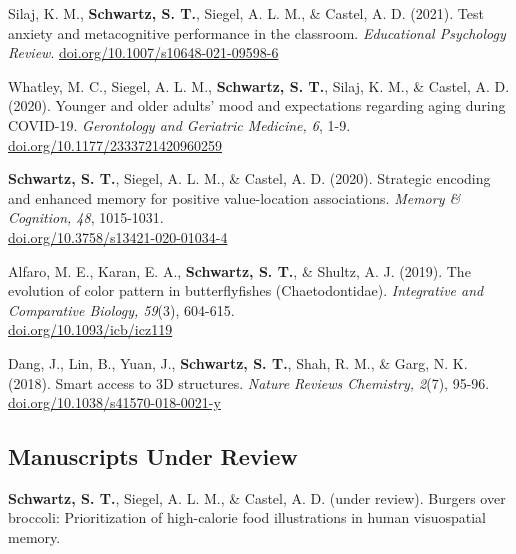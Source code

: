 \pubspace

Silaj, K. M., \textbf{Schwartz, S. T.}, Siegel, A. L. M., \& Castel, A. D. (2021). Test anxiety and metacognitive performance in the classroom. \textit{Educational Psychology Review}. \textcolor{RoyalBlue}{\href{https://doi.org/10.1007/s10648-021-09598-6}{doi.org/10.1007/s10648-021-09598-6}}

\pubspace

Whatley, M. C., Siegel, A. L. M., \textbf{Schwartz, S. T.}, Silaj, K. M., \& Castel, A. D. (2020). Younger and older adults' mood and expectations regarding aging during COVID-19. \textit{Gerontology and Geriatric Medicine, 6}, 1-9. \textcolor{RoyalBlue}{\href{https://doi.org/10.1177/2333721420960259}{doi.org/10.1177/2333721420960259}}

\pubspace

\textbf{Schwartz, S. T.}, Siegel, A. L. M., \& Castel, A. D. (2020). Strategic encoding and enhanced memory for positive value-location associations. \textit{Memory \& Cognition, 48}, 1015-1031. \\ \textcolor{RoyalBlue}{\href{https://doi.org/10.3758/s13421-020-01034-4}{doi.org/10.3758/s13421-020-01034-4}}

\pubspace

Alfaro, M. E., Karan, E. A., \textbf{Schwartz, S. T.}, \& Shultz, A. J. (2019). The evolution of color pattern in butterflyfishes (Chaetodontidae). \textit{Integrative and Comparative Biology, 59}(3), 604-615.\\ \textcolor{RoyalBlue}{\href{https://doi.org/10.1093/icb/icz119}{doi.org/10.1093/icb/icz119}}

\pubspace

Dang, J., Lin, B., Yuan, J., \textbf{Schwartz, S. T.}, Shah, R. M., \& Garg, N. K. (2018). Smart access to 3D structures. \textit{Nature Reviews Chemistry, 2}(7), 95-96. \textcolor{RoyalBlue}{\href{https://doi.org/10.1038/s41570-018-0021-y}{doi.org/10.1038/s41570-018-0021-y}}

\subsection*{Manuscripts Under Review}
\textbf{Schwartz, S. T.}, Siegel, A. L. M., \& Castel, A. D. (under review). Burgers over broccoli: Prioritization of high-calorie food illustrations in human visuospatial memory.

\pubspace

